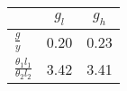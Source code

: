 \begin{tiny}\begin{tabular}{|l|c|c|}
\hline
&\textbf{$g_l$}&\textbf{$g_h$}\\\hline
\textbf{$\frac{g}{y}$}&0.20&0.23\\\hline
\textbf{$\frac{\theta_1 l_1}{\theta_2 l_2}$}&3.42&3.41\\\hline
\end{tabular}
\end{tiny}